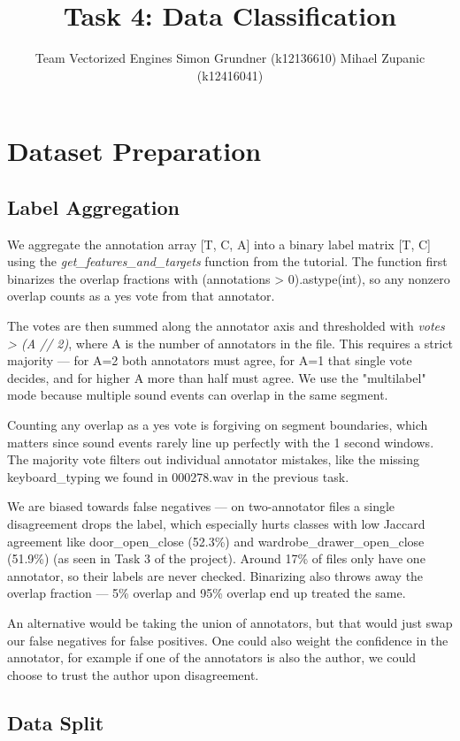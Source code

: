 \documentclass{article}
\title{Task 4: Data Classification}
\author{%
  Team Vectorized Engines \AND
  Simon Grundner (k12136610)
  \And
  Mihael Zupanic (k12416041)
}
\begin{document}
\maketitle

\section{Dataset Preparation}
\subsection{Label Aggregation}

We aggregate the annotation array [T, C, A] into a binary label matrix [T, C] using the \emph{get\_features\_and\_targets} function from the tutorial. The function first binarizes the overlap fractions with (annotations > 0).astype(int), so any nonzero overlap counts as a yes vote from that annotator.

The votes are then summed along the annotator axis and thresholded with \emph{votes > (A // 2)}, where A is the number of annotators in the file. This requires a strict majority — for A=2 both annotators must agree, for A=1 that single vote decides, and for higher A more than half must agree. We use the "multilabel" mode because multiple sound events can overlap in the same segment.

Counting any overlap as a yes vote is forgiving on segment boundaries, which matters since sound events rarely line up perfectly with the 1 second windows. The majority vote filters out individual annotator mistakes, like the missing keyboard\_typing we found in 000278.wav in the previous task.

We are biased towards false negatives — on two-annotator files a single disagreement drops the label, which especially hurts classes with low Jaccard agreement like door\_open\_close (52.3\%) and wardrobe\_drawer\_open\_close (51.9\%) (as seen in Task 3 of the project). Around 17\% of files only have one annotator, so their labels are never checked. Binarizing also throws away the overlap fraction — 5\% overlap and 95\% overlap end up treated the same.

An alternative would be taking the union of annotators, but that would just swap our false negatives for false positives. One could also weight the confidence in the annotator, for example if one of the annotators is also the author, we could choose to trust the author upon disagreement.

\subsection{Data Split}\label{sec:data-split}
\end{document}
